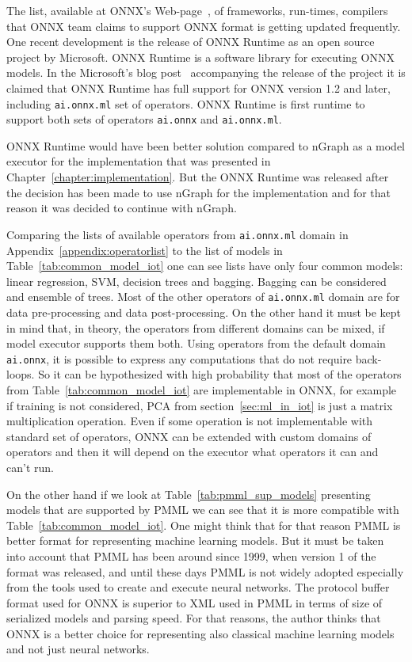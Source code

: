 \documentclass[english, 12pt, a4paper, elec, utf8, online]{aaltothesis}
\begin{document}
The list, available at ONNX's Web-page~\cite{onnx_tools}, of frameworks, run-times, compilers that ONNX team claims to support ONNX format is getting updated frequently. One recent development is the release of ONNX Runtime as an open source project by Microsoft. ONNX Runtime is a software library for executing ONNX models. In the Microsoft's blog post~\cite{onnx_runtime} accompanying the release of the project it is claimed that ONNX Runtime has full support for ONNX version 1.2 and later, including \texttt{ai.onnx.ml} set of operators.
ONNX Runtime is first runtime to support both sets of operators \texttt{ai.onnx} and \texttt{ai.onnx.ml}. 

ONNX Runtime would have been better solution compared to nGraph as a model executor for the implementation that was presented in Chapter~\ref{chapter:implementation}. But the ONNX Runtime was released after the decision has been made to use nGraph for the implementation and for that reason it was decided to continue with nGraph.

Comparing the lists of available operators from \texttt{ai.onnx.ml} domain in Appendix~\ref{appendix:operatorlist} to the list of models in Table~\ref{tab:common_model_iot} one can see lists have only four common models: linear regression, SVM, decision trees and bagging. Bagging can be considered and ensemble of trees. Most of the other operators of \texttt{ai.onnx.ml} domain are for data pre-processing and data post-processing. On the  other hand it must be kept in mind that, in theory, the operators from different domains can be mixed, if model executor supports them both. Using operators from the default domain \texttt{ai.onnx}, it is possible to express any computations that do not require back-loops. So it can be hypothesized with high probability that most of the operators from Table~\ref{tab:common_model_iot} are implementable in ONNX, for example if training is not considered, PCA from section~\ref{sec:ml_in_iot} is just a matrix multiplication operation. Even if some operation is not implementable with standard set of operators, ONNX can be extended with custom domains of operators and then it will depend on the executor what operators it can and can't run. 

On the other hand if we look at Table~\ref{tab:pmml_sup_models} presenting models that are supported by PMML we can see that it is more compatible with Table~\ref{tab:common_model_iot}. One might think that for that reason PMML is better format for representing machine learning models. But it must be taken into account that PMML has been around since 1999, when version 1 of the format was released, and until these days PMML is not widely adopted especially from the tools used to create and execute neural networks. The protocol buffer format used for ONNX is superior to XML used in PMML in terms of size of serialized models and parsing speed. For that reasons, the author thinks that ONNX is a better choice for representing also classical machine learning models and not just neural networks. 
\end{document}
